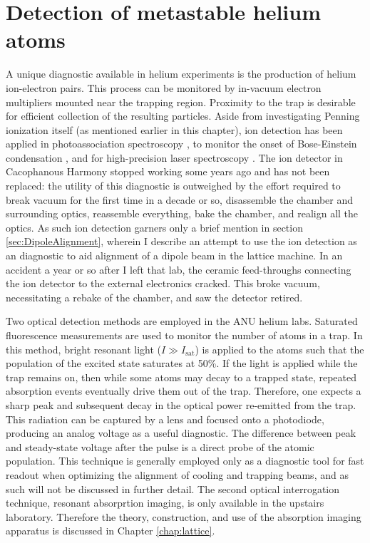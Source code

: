 

\section{Detection of metastable helium atoms}

	A unique diagnostic available in helium experiments is the production of helium ion-electron pairs. This process can be monitored by in-vacuum electron multipliers mounted near the trapping region. Proximity to the trap is desirable for efficient collection of the resulting particles. Aside from investigating Penning ionization itself (as mentioned earlier in this chapter), ion detection has been applied in photoassociation spectroscopy \cite{herschbach00,koelemeij04}, to monitor the onset of Bose-Einstein condensation \cite{tychkov06}, and for high-precision laser spectroscopy \cite{Rengelink18}. The ion detector in Cacophanous Harmony stopped working some years ago and has not been replaced: the utility of this diagnostic is outweighed by the effort required to break vacuum for the first time in a decade or so, disassemble the chamber and surrounding optics, reassemble everything, bake the chamber, and realign all the optics. As such ion detection garners only a brief mention in section \ref{sec:DipoleAlignment}, wherein I describe an attempt to use the ion detection as an diagnostic to aid alignment of a dipole beam in the lattice machine. In an accident a year or so after I left that lab, the ceramic feed-throughs connecting the ion detector to the external electronics cracked. This broke vacuum, necessitating a rebake of the chamber, and saw the detector retired. 

	Two optical detection methods are employed in the ANU helium labs. Saturated fluorescence measurements are used to monitor the number of atoms in a trap. In this method, bright resonant light ($I\gg I_\textrm{sat}$) is applied to the atoms such that the population of the excited state saturates at 50\%. If the light is applied while the trap remains on, then while some atoms may decay to a trapped state, repeated absorption events eventually drive them out of the trap. Therefore, one expects a sharp peak and subsequent decay in the optical power re-emitted from the trap. This radiation can be captured by a lens and focused onto a photodiode, producing an analog voltage as a useful diagnostic. The difference between peak and steady-state voltage after the pulse is a direct probe of the atomic population. This technique is generally employed only as a diagnostic tool for fast readout when optimizing the alignment of cooling and trapping beams, and as such will not be discussed in further detail. The second optical interrogation technique, resonant absorprtion imaging, is only available in the upstairs laboratory. Therefore the theory, construction, and use of the absorption imaging apparatus is discussed in Chapter \ref{chap:lattice}. 



